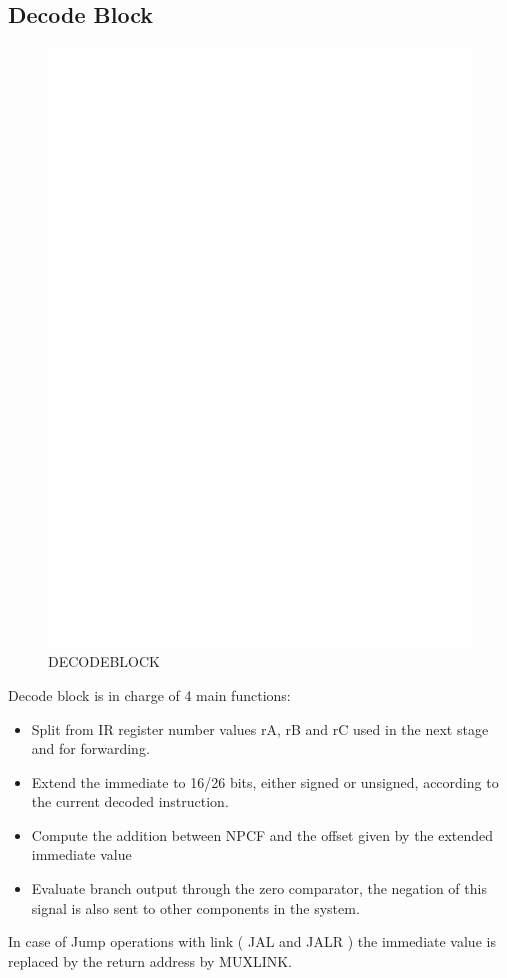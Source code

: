 \documentclass[12pt]{article}
\begin{document}
\subsection{Decode Block}
\begin{figure}[h!]
	\includegraphics[center]{images/DECODE_BLOCK.eps}
	\caption{DECODEBLOCK}
	\label{DECODEBLOCK}
\end{figure}
Decode block is in charge of 4 main functions:
\begin{itemize}
	\item Split from IR register number values rA, rB and rC used in the next stage and for forwarding.
	\item Extend the immediate to 16/26 bits, either signed or unsigned, according to the current decoded instruction.
	\item Compute the addition between NPCF and the offset given by the extended immediate value
	\item Evaluate branch output through the zero comparator, the negation of this signal is also sent to other components in the system.
\end{itemize}
In case of Jump operations with link ( JAL and JALR ) the immediate value is replaced by the return address by MUXLINK.
\end{document}
